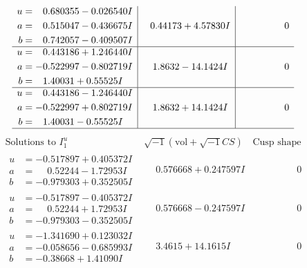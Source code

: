 \documentclass[1p]{elsarticle_modified}
\theoremstyle{definition}
\newcommand{\I}{\sqrt{-1}}
\begin{document}
$$\begin{array}{c|c|c}
\begin{aligned}
u &= \phantom{-}0.680355 - 0.026540 I \\
a &= \phantom{-}0.515047 - 0.436675 I \\
b &= \phantom{-}0.742057 - 0.409507 I\end{aligned}
 & \phantom{-}0.44173 + 4.57830 I & \phantom{-0.000000 } 0 \\ \hline\begin{aligned}
u &= \phantom{-}0.443186 + 1.246440 I \\
a &= -0.522997 - 0.802719 I \\
b &= \phantom{-}1.40031 + 0.55525 I\end{aligned}
 & \phantom{-}1.8632 - 14.1424 I & \phantom{-0.000000 } 0 \\ \hline\begin{aligned}
u &= \phantom{-}0.443186 - 1.246440 I \\
a &= -0.522997 + 0.802719 I \\
b &= \phantom{-}1.40031 - 0.55525 I\end{aligned}
 & \phantom{-}1.8632 + 14.1424 I & \phantom{-0.000000 } 0\\
 \hline 
 \end{array}$$\newpage$$\begin{array}{c|c|c}  
\text{Solutions to }I^u_{1}& \I (\text{vol} + \sqrt{-1}CS) & \text{Cusp shape}\\
 \hline 
\begin{aligned}
u &= -0.517897 + 0.405372 I \\
a &= \phantom{-}0.52244 - 1.72953 I \\
b &= -0.979303 + 0.352505 I\end{aligned}
 & \phantom{-}0.576668 + 0.247597 I & \phantom{-0.000000 } 0 \\ \hline\begin{aligned}
u &= -0.517897 - 0.405372 I \\
a &= \phantom{-}0.52244 + 1.72953 I \\
b &= -0.979303 - 0.352505 I\end{aligned}
 & \phantom{-}0.576668 - 0.247597 I & \phantom{-0.000000 } 0 \\ \hline\begin{aligned}
u &= -1.341690 + 0.123032 I \\
a &= -0.058656 - 0.685993 I \\
b &= -0.38668 + 1.41090 I\end{aligned}
 & \phantom{-}3.4615 + 14.1615 I & \phantom{-0.000000 } 0 \\ \hline\begin{aligned}

\end{aligned}
\end{array}$$
\end{document}
